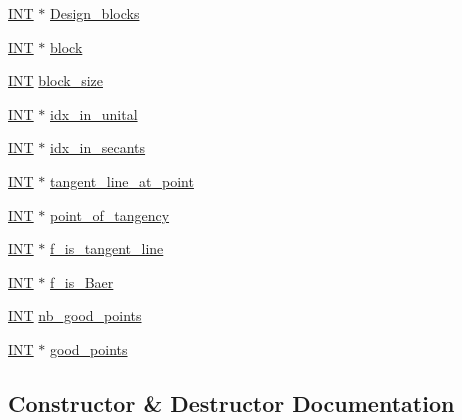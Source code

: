 \begin{DoxyCompactItemize}
\item 
\mbox{\hyperlink{galois_8h_a09fddde158a3a20bd2dcadb609de11dc}{I\+NT}} $\ast$ \mbox{\hyperlink{classbuekenhout__metz_a261491bb7aeab0f2e8efb45ebde2f937}{Design\+\_\+blocks}}
\item 
\mbox{\hyperlink{galois_8h_a09fddde158a3a20bd2dcadb609de11dc}{I\+NT}} $\ast$ \mbox{\hyperlink{classbuekenhout__metz_a56e27df5339491105d42af0f81f38b6b}{block}}
\item 
\mbox{\hyperlink{galois_8h_a09fddde158a3a20bd2dcadb609de11dc}{I\+NT}} \mbox{\hyperlink{classbuekenhout__metz_aac004fd26678f4888def177100371a79}{block\+\_\+size}}
\item 
\mbox{\hyperlink{galois_8h_a09fddde158a3a20bd2dcadb609de11dc}{I\+NT}} $\ast$ \mbox{\hyperlink{classbuekenhout__metz_a656e0068e2c3765d2f916e86c71292ae}{idx\+\_\+in\+\_\+unital}}
\item 
\mbox{\hyperlink{galois_8h_a09fddde158a3a20bd2dcadb609de11dc}{I\+NT}} $\ast$ \mbox{\hyperlink{classbuekenhout__metz_a0b98c5c71d880d3e1160d4133f0d44b1}{idx\+\_\+in\+\_\+secants}}
\item 
\mbox{\hyperlink{galois_8h_a09fddde158a3a20bd2dcadb609de11dc}{I\+NT}} $\ast$ \mbox{\hyperlink{classbuekenhout__metz_ac9817e94c5b020c100e947e32fa2f931}{tangent\+\_\+line\+\_\+at\+\_\+point}}
\item 
\mbox{\hyperlink{galois_8h_a09fddde158a3a20bd2dcadb609de11dc}{I\+NT}} $\ast$ \mbox{\hyperlink{classbuekenhout__metz_a84a14c1dafff2ea454695c1d46134f3f}{point\+\_\+of\+\_\+tangency}}
\item 
\mbox{\hyperlink{galois_8h_a09fddde158a3a20bd2dcadb609de11dc}{I\+NT}} $\ast$ \mbox{\hyperlink{classbuekenhout__metz_a3b2120d901b825d58fc143e1c02539b8}{f\+\_\+is\+\_\+tangent\+\_\+line}}
\item 
\mbox{\hyperlink{galois_8h_a09fddde158a3a20bd2dcadb609de11dc}{I\+NT}} $\ast$ \mbox{\hyperlink{classbuekenhout__metz_a4b9d08cd13d99f79be3663c8894c64fe}{f\+\_\+is\+\_\+\+Baer}}
\item 
\mbox{\hyperlink{galois_8h_a09fddde158a3a20bd2dcadb609de11dc}{I\+NT}} \mbox{\hyperlink{classbuekenhout__metz_a9a4a44350da7f141cfa3d392000b4d41}{nb\+\_\+good\+\_\+points}}
\item 
\mbox{\hyperlink{galois_8h_a09fddde158a3a20bd2dcadb609de11dc}{I\+NT}} $\ast$ \mbox{\hyperlink{classbuekenhout__metz_abcef63f911ba9949b615cc213217f998}{good\+\_\+points}}
\end{DoxyCompactItemize}


\subsection{Constructor \& Destructor Documentation}
\mbox{\label{classbuekenhout__metz_a7d7e3cf921b815313faecf969d5432ca}} 
